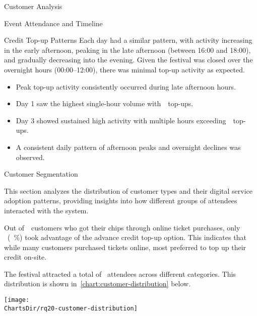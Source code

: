 \begin{section}{Customer Analysis}
\begin{subsection}{Event Attendance and Timeline}
\begin{subsubsection}{Credit Top-up Patterns}
			Each day had a similar pattern, with activity increasing in the early afternoon, peaking in the late afternoon (between 16:00 and 18:00), and gradually decreasing into the evening.
			Given the festival was closed over the overnight hours (00:00--12:00), there was minimal top-up activity as expected.

			\begin{keytakeaways}
				\begin{itemize}
					\item Peak top-up activity consistently occurred during late afternoon hours.
					\item Day 1 saw the highest single-hour volume with~~top-ups.
					\item Day 3 showed sustained high activity with multiple hours exceeding~~top-ups.
					\item A consistent daily pattern of afternoon peaks and overnight declines was observed.
				\end{itemize}
			\end{keytakeaways}
		\end{subsubsection}
	\end{subsection}


	\begin{subsection}{Customer Segmentation}
		\label{subsec:analysis-customer-segmentation}

		This section analyzes the distribution of customer types and their digital service adoption patterns, providing insights into how different groups of attendees interacted with the system.


		Out of~~customers who got their chips through online ticket purchases, only ~(~\%) took advantage of the advance credit top-up option.
		This indicates that while many customers purchased tickets online, most preferred to top up their credit on-site.


		The festival attracted a total of~ attendees across different categories.
		This distribution is shown in~\autoref{chart:customer-distribution} below.

		\begin{chart}[H]
			\centering
			\texttt{[image: \\ChartsDir/rq20-customer-distribution]}
			\caption{ Customer Distribution by Type}
			\label{chart:customer-distribution}
			\source
		\end{chart}


\end{subsection}
\end{section}

